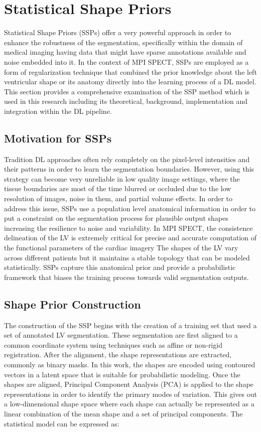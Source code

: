 \section{Statistical Shape Priors}
Statistical Shape Priors (SSPs) offer a very powerful approach in order to enhance the robustness of the segmentation, specifically within the domain of medical imaging having data that might have sparse annotations available and noise embedded into it. In the context of MPI SPECT, SSPs are employed as a form of regularization technique that combined the prior knowledge about the left ventricular shape or its anatomy directly into the learning process of a DL model. This section provides a comprehensive examination of the SSP method which is used in this research including its theoretical, background, implementation and integration within the DL pipeline.

\subsection{Motivation for SSPs}
Tradition DL approaches often rely completely on the pixel-level intensities and their patterns in order to learn the segmentation boundaries. However, using this strategy can become very unreliable in low quality image settings, where the tissue boundaries are most of the time blurred or occluded due to the low resolution of images, noise in them, and partial volume effects. In order to address this issue, SSPs use a population level anatomical information in order to put a constraint on the segmentation process for plausible output shapes increasing the resilience to noise and variability. In MPI SPECT, the consistence delineation of the LV is extremely critical for precise and accurate computation of the functional parameters of the cardiac imagery The shapes of the LV vary across different patients but it maintains a stable topology that can be modeled statistically. SSPs capture this anatomical prior and provide a probabilistic framework that biases the training process towards valid segmentation outputs.

\subsection{Shape Prior Construction}
The construction of the SSP begins with the creation of a training set that used a set of annotated LV segmentation. These segmentation are first aligned to a common coordinate system using techniques such as affine or non-rigid registration. After the alignment, the shape representations are extracted, commonly as binary masks. In this work, the shapes are encoded using contoured vectors in a latent space that is suitable for probabilistic modeling. Once the shapes are aligned, Principal Component Analysis (PCA) is applied to the shape representations in order to identify the primary modes of variation. This gives out a low-dimensional shape space where each shape can actually be represented as a linear combination of the mean shape and a set of principal components. The statistical model can be expressed as:

